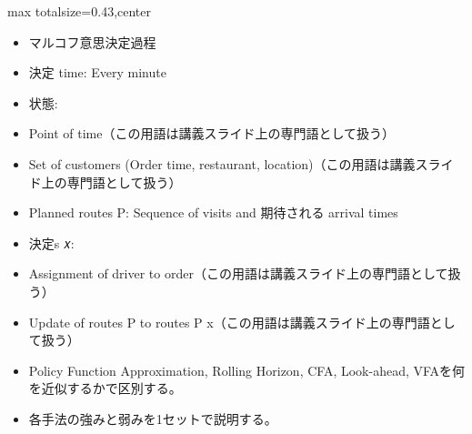 \clearpage
{}
\begin{minipage}[t]{0.405\textwidth}
\begin{adjustbox}{max totalsize={\textwidth}{0.43\textheight},center}
\begin{minipage}{\textwidth}\scriptsize
{}\begin{itemize}
\item マルコフ意思決定過程
\item 決定 time: Every minute
\item 状態:
\item Point of time（この用語は講義スライド上の専門語として扱う）
\item Set of customers (Order time, restaurant, location)（この用語は講義スライド上の専門語として扱う）
\item Planned routes P: Sequence of visits and 期待される arrival times
\item 決定s 𝑥:
\item Assignment of driver to order（この用語は講義スライド上の専門語として扱う）
\item Update of routes P to routes P x（この用語は講義スライド上の専門語として扱う）
\end{itemize}\begin{itemize}
\item Policy Function Approximation, Rolling Horizon, CFA, Look-ahead, VFAを何を近似するかで区別する。
\item 各手法の強みと弱みを1セットで説明する。
\end{itemize}
\end{minipage}
\end{adjustbox}
\end{minipage}\hfill
